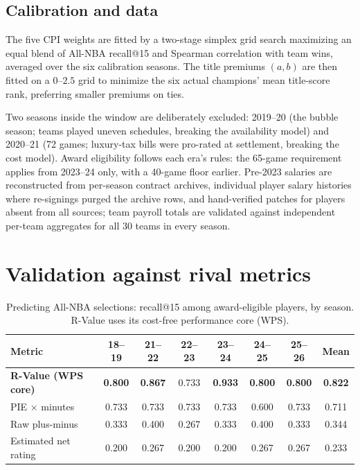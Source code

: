 \documentclass[11pt]{article}
\begin{document}
\subsection{Calibration and data}
\label{sec:calib}
The five CPI weights are fitted by a two-stage simplex grid search maximizing
an equal blend of All-NBA recall@15 and Spearman correlation with team wins,
averaged over the six calibration seasons. The title premiums $(a,b)$ are then
fitted on a $0$--$2.5$ grid to minimize the six actual champions' mean
title-score rank, preferring smaller premiums on ties.

Two seasons inside the window are deliberately excluded: 2019--20 (the bubble
season; teams played uneven schedules, breaking the availability model) and
2020--21 (72 games; luxury-tax bills were pro-rated at settlement, breaking
the cost model). Award eligibility follows each era's rules: the 65-game
requirement applies from 2023--24 only, with a 40-game floor earlier.
Pre-2023 salaries are reconstructed from per-season contract archives,
individual player salary histories where re-signings purged the archive rows,
and hand-verified patches for players absent from all sources; team payroll
totals are validated against independent per-team aggregates for all 30 teams
in every season.

\section{Validation against rival metrics}
\label{sec:rivals}

\begin{table}[h]\centering
\caption{Predicting All-NBA selections: recall@15 among award-eligible
players, by season. R-Value uses its cost-free performance core (WPS).}
\small
\begin{tabular}{lccccccc}
\toprule
Metric & 18--19 & 21--22 & 22--23 & 23--24 & 24--25 & 25--26 & Mean \\
\midrule
\textbf{R-Value (WPS core)} & \textbf{0.800} & \textbf{0.867} & 0.733 & \textbf{0.933} & \textbf{0.800} & \textbf{0.800} & \textbf{0.822} \\
PIE $\times$ minutes        & 0.733 & 0.733 & 0.733 & 0.733 & 0.600 & 0.733 & 0.711 \\
Raw plus-minus              & 0.333 & 0.400 & 0.267 & 0.333 & 0.400 & 0.333 & 0.344 \\
Estimated net rating        & 0.200 & 0.267 & 0.200 & 0.200 & 0.267 & 0.267 & 0.233 \\
\bottomrule
\end{tabular}
\end{table}
\end{document}
